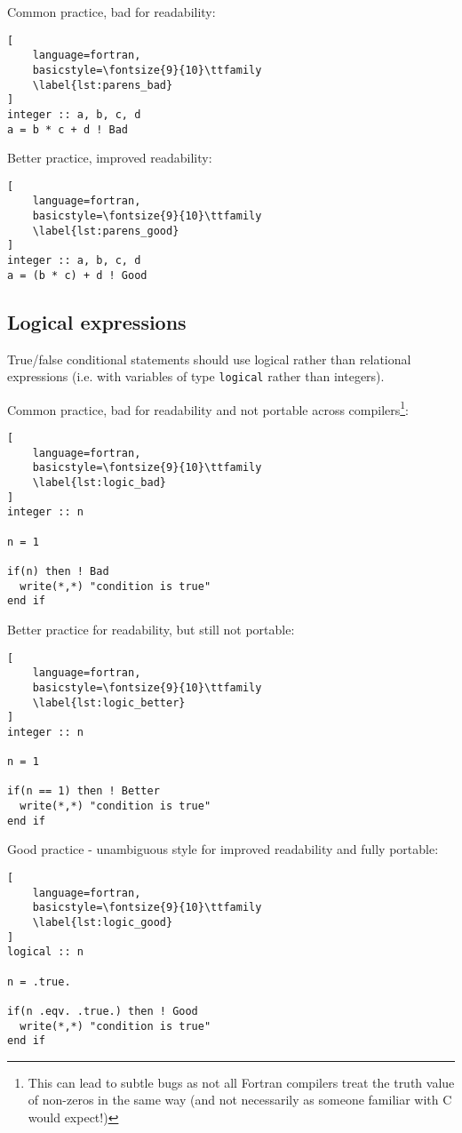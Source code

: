 \documentclass[11pt]{report}
\begin{document}
Common practice, bad for readability:
\begin{lstlisting}[
	language=fortran,
    basicstyle=\fontsize{9}{10}\ttfamily
    \label{lst:parens_bad}
]
integer :: a, b, c, d
a = b * c + d ! Bad
\end{lstlisting}

Better practice, improved readability:
\begin{lstlisting}[
	language=fortran,
    basicstyle=\fontsize{9}{10}\ttfamily
    \label{lst:parens_good}
]
integer :: a, b, c, d
a = (b * c) + d ! Good
\end{lstlisting}

\subsection{Logical expressions}
True/false conditional statements should use logical rather than relational expressions (i.e. with variables of 
type \texttt{logical} rather than integers). 

Common practice, bad for readability and not portable across compilers\footnote{This can lead to subtle bugs as not all Fortran
  compilers treat the truth value of non-zeros in the same way (and not necessarily as someone
  familiar with C would expect!)}:
\begin{lstlisting}[
	language=fortran,
    basicstyle=\fontsize{9}{10}\ttfamily
    \label{lst:logic_bad}
]
integer :: n

n = 1

if(n) then ! Bad
  write(*,*) "condition is true"
end if
\end{lstlisting}

Better practice for readability, but still not portable:
\begin{lstlisting}[
	language=fortran,
    basicstyle=\fontsize{9}{10}\ttfamily
    \label{lst:logic_better}
]
integer :: n

n = 1

if(n == 1) then ! Better
  write(*,*) "condition is true"
end if
\end{lstlisting}

Good practice - unambiguous style for improved readability and fully portable:

\begin{lstlisting}[
	language=fortran,
    basicstyle=\fontsize{9}{10}\ttfamily
    \label{lst:logic_good}
]
logical :: n

n = .true.

if(n .eqv. .true.) then ! Good
  write(*,*) "condition is true"
end if
\end{lstlisting}
\end{document}
